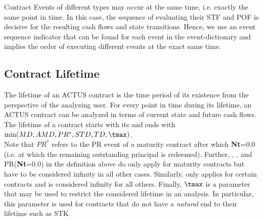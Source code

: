 
Contract Events of different types may occur at the same time, i.e. exactly the same point in time. In this case, the sequence of evaluating their STF and POF is decisive for the resulting cash flows and state transitions. Hence, we use an event sequence indicator that can be found for each event in the event-dictionary and implies the order of executing different events at the exact same time.


\subsection{Contract Lifetime}\label{sec:lifetime}

The lifetime of an ACTUS contract is the time period of its existence from the perspective of the analyzing user. For every point in time during its lifetime, an ACTUS contract can be analyzed in terms of current state and future cash flows.\\

The lifetime of a contract starts with its  and ends with $\min(MD, AMD, PR^*, STD, TD,\tmax)$.\\

Note that $PR^*$ refers to the PR event of a maturity contract after which \textbf{Nt}=0.0 (i.e. at which the remaining outstanding principal is redeemed). Further, , , and PR(\textbf{Nt}=0.0) in the definition above do only apply for maturity contracts but have to be considered infinity in all other cases. Similarly,  only applies for certain contracts and is considered infinity for all others. Finally, $\tmax$ is a parameter that may be used to restrict the considered lifetime in an analysis. In particular, this parameter is used for contracts that do not have a \textit{natural} end to their lifetime such as STK.

